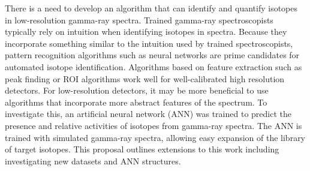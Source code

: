 There is a need to develop an algorithm that can identify and quantify isotopes in low-resolution gamma-ray spectra. Trained gamma-ray spectroscopists typically rely on intuition when identifying isotopes in spectra. Because they incorporate something similar to the intuition used by trained spectroscopists, pattern recognition algorithms such as neural networks are prime candidates for automated isotope identification. Algorithms based on feature extraction such as peak finding or ROI algorithms work well for well-calibrated high resolution detectors. For low-resolution detectors, it may be more beneficial to use algorithms that incorporate more abstract features of the spectrum. To investigate this, an artificial neural network (ANN) was trained to predict the presence and relative activities of isotopes from gamma-ray spectra. The ANN is trained with simulated gamma-ray spectra, allowing easy expansion of the library of target isotopes. This proposal outlines extensions to this work including investigating new datasets and ANN structures.


